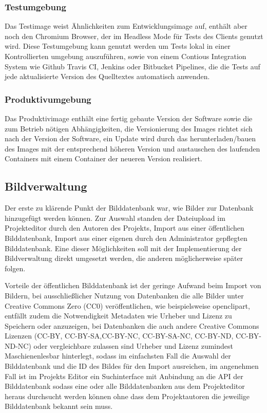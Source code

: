 \subsubsection{Testumgebung}

Das Testimage weist Ähnlichkeiten zum Entwicklungsimage auf, enthält
aber noch den Chromium Browser, der im Headless Mode für Tests des Clients
genutzt wird. Diese Testumgebung kann genutzt werden um Tests lokal in einer
Kontrollierten umgebung auszuführen, sowie von einem Contious Integration System
wie Github Travis CI, Jenkins oder Bitbucket Pipelines, die die Tests auf jede
aktualisierte Version des Quelltextes automatisch anwenden.

\subsubsection{Produktivumgebung}

Das Produktivimage enthält eine fertig gebaute Version der Software sowie die
zum Betrieb nötigen Abhängigkeiten, die Versionierung des Images richtet sich
nach der Version der Software, ein Update wird durch das herunterladen/bauen des
Images mit der entsprechend höheren Version und austauschen des laufenden
Containers mit einem Container der neueren Version realisiert.

\subsection{Bildverwaltung}

Der erste zu klärende Punkt der Bilddatenbank war, wie Bilder zur
Datenbank hinzugefügt werden können. Zur
Auswahl standen der Dateiupload im
Projekteditor durch den Autoren des Projekts, Import aus einer
öffentlichen Bilddatenbank, Import aus einer eigenen durch den
Administrator gepflegten Bilddatenbank.  Eine dieser Möglichkeiten
soll mit der Implementierung der Bildverwaltung direkt umgesetzt
werden, die anderen möglicherweise später folgen.

Vorteile der öffentlichen
Bilddatenbank ist der geringe Aufwand beim Import von Bildern, bei
ausschließlicher Nutzung von Datenbanken die alle Bilder unter
Creative Commons Zero (CC0) veröffentlichen, wie beispielsweise
openclipart, entfällt zudem die Notwendigkeit Metadaten wie Urheber
und Lizenz zu Speichern oder anzuzeigen, bei Datenbanken die auch
andere Creative Commons Lizenzen (CC-BY, CC-BY-SA,CC-BY-NC,
CC-BY-SA-NC, CC-BY-ND, CC-BY-ND-NC) oder vergleichbare zulassen sind
Urheber und Lizenz zumindest Maschienenlesbar hinterlegt, sodass im
einfachsten Fall die Auswahl der Bilddatenbank und die ID des Bildes
für den Import ausreichen, im angenehmen Fall ist im Projekts Editor
ein Suchinterface mit Anbindung an die API der Bilddatenbank sodass
eine oder alle Bilddatenbanken aus dem Projekteditor heraus durchsucht
werden können ohne dass dem Projektautoren die jeweilige Bilddatenbank
bekannt sein muss.

